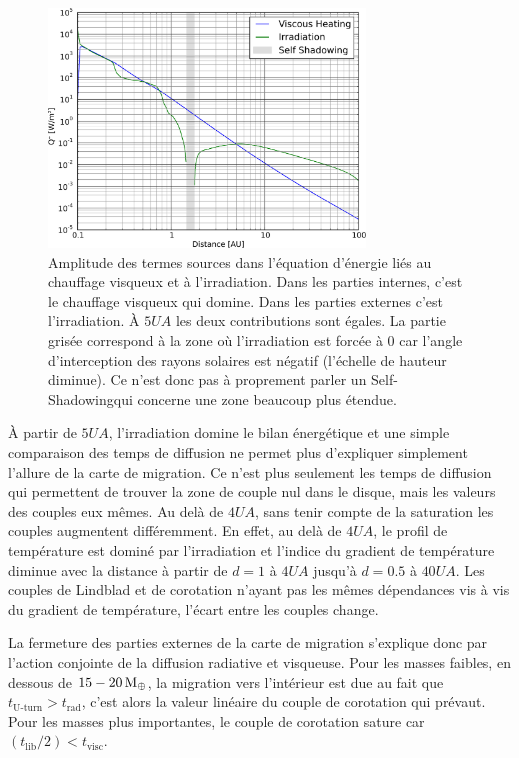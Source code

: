 \begin{figure}[htbp]
\centering
\includegraphics[width=0.75\textwidth]{figure/migration_map/viscous_vs_irradiation.pdf}

\caption[Amplitude du chauffage visqueux et de l'irradiation dans le disque.]{Amplitude des termes sources dans l'équation
d'énergie liés au chauffage visqueux et à l'irradiation. Dans les parties internes, c'est le
chauffage visqueux qui domine. Dans les parties externes c'est l'irradiation. À $5\unit{UA}$ les deux contributions sont
égales. La partie grisée correspond à la zone où l'irradiation est forcée à 0 car l'angle d'interception des rayons solaires est négatif (l'échelle de hauteur diminue). Ce n'est donc pas à proprement parler un \og Self-Shadowing\fg qui concerne une zone beaucoup plus étendue.}\label{fig:viscous_vs_irradiation}
\end{figure}

À partir de $5\unit{UA}$, l'irradiation domine le bilan énergétique  et une simple comparaison des temps de diffusion ne permet plus d'expliquer simplement l'allure de la carte de migration. Ce n'est plus seulement les temps de diffusion qui permettent de trouver la zone de couple nul dans le disque, mais les valeurs des couples eux mêmes. Au delà de $4\unit{UA}$, sans tenir compte de la saturation les couples augmentent différemment. En effet, au delà de $4\unit{UA}$, le profil de température est dominé par l'irradiation et l'indice du gradient de température diminue avec la distance à partir de $d=1$ à $4\unit{UA}$ jusqu'à $d=0.5$ à $40\unit{UA}$. Les couples de Lindblad et de corotation n'ayant pas les mêmes dépendances vis à vis du gradient de température, l'écart entre les couples change.

La fermeture des parties externes de la carte de migration s'explique donc par l'action conjointe de la diffusion radiative et visqueuse. Pour les masses
faibles, en dessous de $15-20\mathrm{\thinspace M_\oplus}$, la migration vers l'intérieur est due au fait que $t_\text{U-turn} > t_\text{rad}$, c'est
alors la valeur linéaire du couple de corotation qui prévaut. Pour les masses plus importantes, le couple de corotation sature
car $(t_\text{lib}/2) < t_\text{visc}$. 

